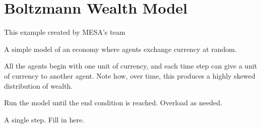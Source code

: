 \documentclass[letterpaper,10pt,english]{sphinxmanual}
\begin{document}
\chapter{Boltzmann Wealth Model}
\label{\detokenize{index:boltzmann-wealth-model}}
This example created by MESA’s team

\begin{fulllineitems}
\label{\detokenize{index:examples.boltzmann_wealth_model.boltzmann_wealth_model.model.BoltzmannWealthModel}}
A simple model of an economy where agents exchange currency at random.

All the agents begin with one unit of currency, and each time step can give
a unit of currency to another agent. Note how, over time, this produces a
highly skewed distribution of wealth.

\begin{fulllineitems}
\label{\detokenize{index:examples.boltzmann_wealth_model.boltzmann_wealth_model.model.BoltzmannWealthModel.run_model}}
Run the model until the end condition is reached. Overload as
needed.

\end{fulllineitems}


\begin{fulllineitems}
\label{\detokenize{index:examples.boltzmann_wealth_model.boltzmann_wealth_model.model.BoltzmannWealthModel.step}}
A single step. Fill in here.

\end{fulllineitems}


\end{fulllineitems}
\end{document}
